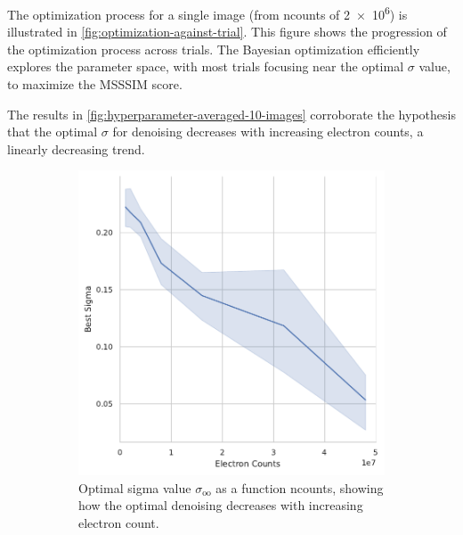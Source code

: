 The optimization process for a single image (from \gls{ncounts} of \num{2e6}) is illustrated in \cref{fig:optimization-against-trial}. This figure shows the progression of the optimization process across trials. The Bayesian optimization efficiently explores the parameter space, with most trials focusing near the optimal $\sigma$ value, to maximize the \gls{MSSSIM} score.

The results in \cref{fig:hyperparameter-averaged-10-images} corroborate the hypothesis that the optimal $\sigma$ for denoising decreases with increasing electron counts, a linearly decreasing trend.




\begin{figure}
    \centering
    \begin{subfigure}[t]{0.49\linewidth}
        \centering
        \includegraphics[width=\linewidth]{images/hyperparameter_sigma_averaged_10_images.pdf}
        \caption{Optimal sigma value $\sigma_{\text{oo}}$ as a function \gls{ncounts}, showing how the optimal denoising decreases with increasing electron count.}
        \label{fig:hyperparameter-sigma-averaged-10-images}
    \end{subfigure}
    \hfill
    \begin{subfigure}[t]{0.49\linewidth}
        \centering

\end{subfigure}
\end{figure}
